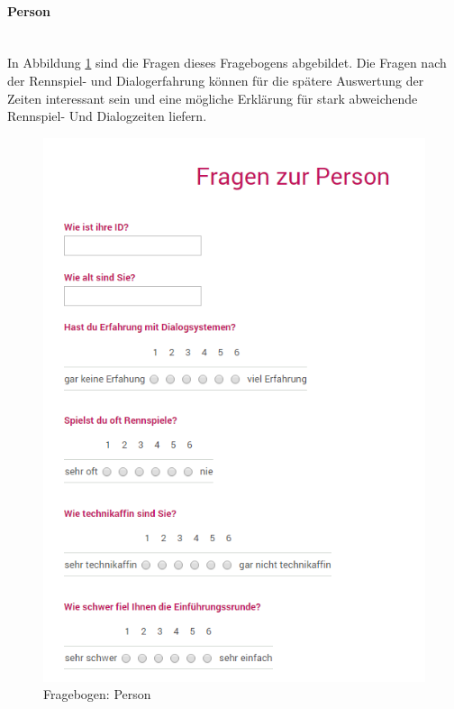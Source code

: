 \documentclass[12pt,a4paper]{scrartcl}
\begin{document}
\paragraph{Person}
~\\
\label{fbperson1}
In Abbildung \ref{fbperson} sind die Fragen dieses Fragebogens abgebildet.
Die Fragen nach der Rennspiel- und Dialogerfahrung können für die spätere Auswertung der Zeiten interessant sein und eine mögliche Erklärung für stark abweichende Rennspiel- Und Dialogzeiten liefern. 
\begin{figure}[htbp]
\begin{center}
\includegraphics[width=12cm]{fbperson.png}
\caption{Fragebogen: Person}
\label{fbperson}
\end{center}
\end{figure}
\end{document}
